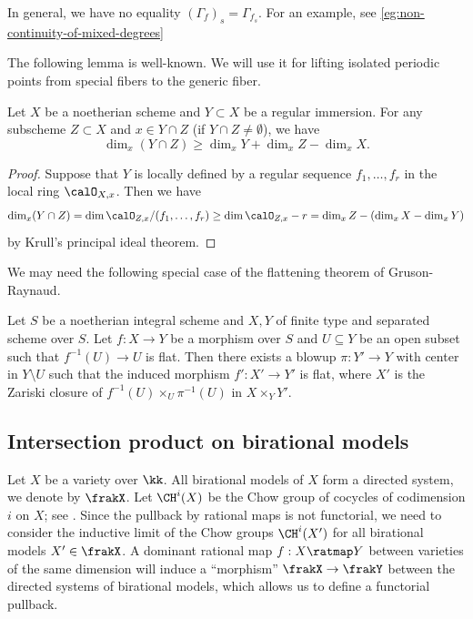   \begin{remark}
    In general, we have no equality $(\Gamma_f)_s = \Gamma_{f_s}$.
    For an example, see \cref{eg:non-continuity-of-mixed-degrees}
  \end{remark}

  The following lemma is well-known.
  We will use it for lifting isolated periodic points from special fibers to the generic fiber.
  \begin{lemma}\label{lem:intersection_dimension_estimate}
    Let $X$ be a noetherian scheme and $Y \subset X$ be a regular immersion.
    For any subscheme $Z \subset X$ and $x \in Y \cap Z$ (if $Y \cap Z \neq \emptyset$), we have 
    \[ \dim_x (Y \cap Z) \geq \dim_x Y + \dim_x Z - \dim_x X. \]
  \end{lemma}
  \begin{proof}
    Suppose that $Y$ is locally defined by a regular sequence $f_1, \dots, f_r$ in the local ring $\calO_{X,x}$.
    Then we have
    \[ \dim_x (Y \cap Z) = \dim \calO_{Z,x} / (f_1, \dots, f_r) \geq \dim \calO_{Z,x} - r = \dim_x Z - (\dim_x X - \dim_x Y) \]
    by Krull's principal ideal theorem.
  \end{proof}
  
  We may need the following special case of the flattening theorem of Gruson-Raynaud.
  \begin{theorem}\label{thm:Gruson-Raynaud_flattening}
    Let $S$ be a noetherian integral scheme and $X,Y$ of finite type and separated scheme over $S$.
    Let $f: X \to Y$ be a morphism over $S$ and $U \subseteq Y$ be an open subset such that $f^{-1}(U) \to U$ is flat.
    Then there exists a blowup $\pi: Y' \to Y$ with center in $Y \setminus U$ such that the induced morphism $f': X' \to Y'$ is flat, where $X'$ is the Zariski closure of $f^{-1}(U) \times_U \pi^{-1}(U)$ in $X \times_Y Y'$.
  \end{theorem}




\subsection{Intersection product on birational models}\label{subsec:intersection_product_on_birational_models}

  Let $X$ be a variety over $\kk$.
  All birational models of $X$ form a directed system, we denote by $\frakX$.
  Let $\CH^i(X)$ be the Chow group of cocycles of codimension $i$ on $X$; see \cite[Chapter 17]{Fulton13Intersection}.
  Since the pullback by rational maps is not functorial, we need to consider the inductive limit of the Chow groups $\CH^i(X')$ for all birational models $X' \in \frakX$.
  A dominant rational map $f: X \ratmap Y$ between varieties of the same dimension will induce a ``morphism'' $\frakX \to \frakY$ between the directed systems of birational models, which allows us to define a functorial pullback.
  
